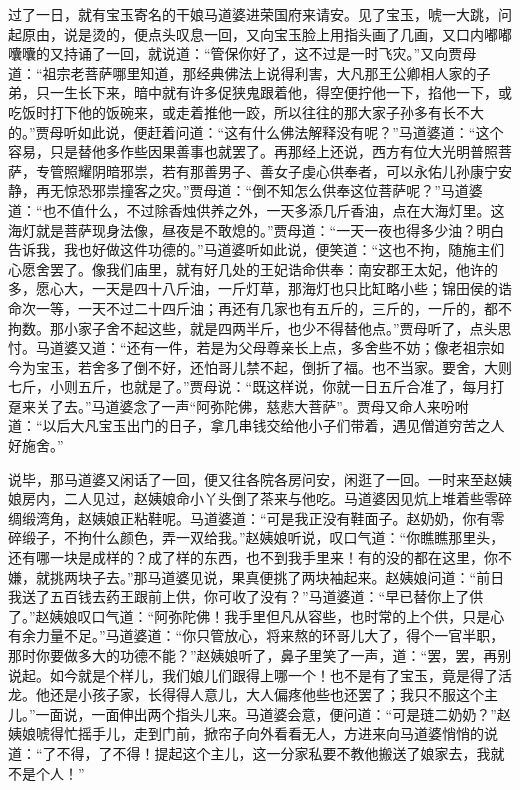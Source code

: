 \documentclass[12pt,oneside]{book}
\begin{document}
过了一日，就有宝玉寄名的干娘马道婆进荣国府来请安。见了宝玉，唬一大跳，问起原由，说是烫的，便点头叹息一回，又向宝玉脸上用指头画了几画，又口内嘟嘟囔囔的又持诵了一回，就说道：“管保你好了，这不过是一时飞灾。”又向贾母道：“祖宗老菩萨哪里知道，那经典佛法上说得利害，大凡那王公卿相人家的子弟，只一生长下来，暗中就有许多促狭鬼跟着他，得空便拧他一下，掐他一下，或吃饭时打下他的饭碗来，或走着推他一跤，所以往往的那大家子孙多有长不大的。”贾母听如此说，便赶着问道：“这有什么佛法解释没有呢？”马道婆道：“这个容易，只是替他多作些因果善事也就罢了。再那经上还说，西方有位大光明普照菩萨，专管照耀阴暗邪祟，若有那善男子、善女子虔心供奉者，可以永佑儿孙康宁安静，再无惊恐邪祟撞客之灾。”贾母道：“倒不知怎么供奉这位菩萨呢？”马道婆道：“也不值什么，不过除香烛供养之外，一天多添几斤香油，点在大海灯里。这海灯就是菩萨现身法像，昼夜是不敢熄的。”贾母道：“一天一夜也得多少油？明白告诉我，我也好做这件功德的。”马道婆听如此说，便笑道：“这也不拘，随施主们心愿舍罢了。像我们庙里，就有好几处的王妃诰命供奉：南安郡王太妃，他许的多，愿心大，一天是四十八斤油，一斤灯草，那海灯也只比缸略小些；锦田侯的诰命次一等，一天不过二十四斤油；再还有几家也有五斤的，三斤的，一斤的，都不拘数。那小家子舍不起这些，就是四两半斤，也少不得替他点。”贾母听了，点头思忖。马道婆又道：“还有一件，若是为父母尊亲长上点，多舍些不妨；像老祖宗如今为宝玉，若舍多了倒不好，还怕哥儿禁不起，倒折了福。也不当家。要舍，大则七斤，小则五斤，也就是了。”贾母说：“既这样说，你就一日五斤合准了，每月打趸来关了去。”马道婆念了一声“阿弥陀佛，慈悲大菩萨”。贾母又命人来吩咐道：“以后大凡宝玉出门的日子，拿几串钱交给他小子们带着，遇见僧道穷苦之人好施舍。”

说毕，那马道婆又闲话了一回，便又往各院各房问安，闲逛了一回。一时来至赵姨娘房内，二人见过，赵姨娘命小丫头倒了茶来与他吃。马道婆因见炕上堆着些零碎绸缎湾角，赵姨娘正粘鞋呢。马道婆道：“可是我正没有鞋面子。赵奶奶，你有零碎缎子，不拘什么颜色，弄一双给我。”赵姨娘听说，叹口气道：“你瞧瞧那里头，还有哪一块是成样的？成了样的东西，也不到我手里来！有的没的都在这里，你不嫌，就挑两块子去。”那马道婆见说，果真便挑了两块袖起来。赵姨娘问道：“前日我送了五百钱去药王跟前上供，你可收了没有？”马道婆道：“早已替你上了供了。”赵姨娘叹口气道：“阿弥陀佛！我手里但凡从容些，也时常的上个供，只是心有余力量不足。”马道婆道：“你只管放心，将来熬的环哥儿大了，得个一官半职，那时你要做多大的功德不能？”赵姨娘听了，鼻子里笑了一声，道：“罢，罢，再别说起。如今就是个样儿，我们娘儿们跟得上哪一个！也不是有了宝玉，竟是得了活龙。他还是小孩子家，长得得人意儿，大人偏疼他些也还罢了；我只不服这个主儿。”一面说，一面伸出两个指头儿来。马道婆会意，便问道：“可是琏二奶奶？”赵姨娘唬得忙摇手儿，走到门前，掀帘子向外看看无人，方进来向马道婆悄悄的说道：“了不得，了不得！提起这个主儿，这一分家私要不教他搬送了娘家去，我就不是个人！”
\end{document}
